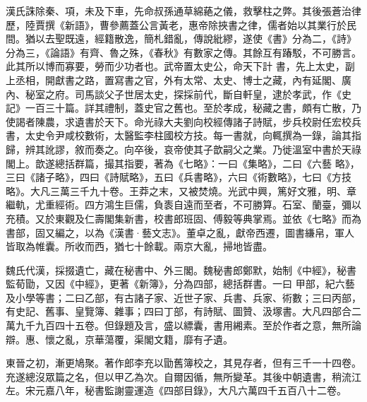 \begin{pinyinscope}
 漢氏誅除秦、項，未及下車，先命叔孫通草綿蕝之儀，救擊柱之弊。其後張蒼治律歷，陸賈撰《新語》，曹參薦蓋公言黃老，惠帝除挾書之律，儒者始以其業行於民間。猶以去聖既遠，經籍散逸，簡札錯亂，傳說紕繆，遂使《書》分為二，《詩》分為三，《論語》有齊、魯之殊，《春秋》有數家之傳。其餘互有踳駁，不可勝言。此其所以博而寡要，勞而少功者也。武帝置太史公，命天下計
 書，先上太史，副上丞相，開獻書之路，置寫書之官，外有太常、太史、博士之藏，內有延閣、廣內、秘室之府。司馬談父子世居太史，探採前代，斷自軒皇，逮於孝武，作《史記》一百三十篇。詳其禮制，蓋史官之舊也。至於孝成，秘藏之書，頗有亡散，乃使謁者陳農，求遺書於天下。命光祿大夫劉向校經傳諸子詩賦，步兵校尉任宏校兵書，太史令尹咸校數術，太醫監李柱國校方技。每一書就，向輒撰為一錄，論其指歸，辨其訛謬，敘而奏之。向卒後，哀帝使其子歆嗣父之業。乃徙溫室中書於天祿閣上。歆遂總括群篇，撮其指要，著為《七略》：一曰《集略》，二曰《六藝
 略》，三曰《諸子略》，四曰《詩賦略》，五曰《兵書略》，六曰《術數略》，七曰《方技略》。大凡三萬三千九十卷。王莽之末，又被焚燒。光武中興，篤好文雅，明、章繼軌，尤重經術。四方鴻生巨儒，負袠自遠而至者，不可勝算。石室、蘭臺，彌以充積。又於東觀及仁壽閣集新書，校書郎班固、傅毅等典掌焉。並依《七略》而為書部，固又編之，以為《漢書·藝文志》。董卓之亂，獻帝西遷，圖書縑帛，軍人皆取為帷囊。所收而西，猶七十餘載。兩京大亂，掃地皆盡。



 魏氏代漢，採掇遺亡，藏在秘書中、外三閣。魏秘書郎鄭默，始制《中經》，秘書監荀勖，又因《中經》，更著《新簿》，分為四部，總括群書。一曰
 甲部，紀六藝及小學等書；二曰乙部，有古諸子家、近世子家、兵書、兵家、術數；三曰丙部，有史記、舊事、皇覽簿、雜事；四曰丁部，有詩賦、圖贊、汲塚書。大凡四部合二萬九千九百四十五卷。但錄題及言，盛以縹囊，書用緗素。至於作者之意，無所論辯。惠、懷之亂，京華蕩覆，渠閣文籍，靡有孑遺。



 東晉之初，漸更鳩聚。著作郎李充以勖舊簿校之，其見存者，但有三千一十四卷。充遂總沒眾篇之名，但以甲乙為次。自爾因循，無所變革。其後中朝遺書，稍流江左。宋元嘉八年，秘書監謝靈運造《四部目錄》，大凡六萬四千五百八十二卷。




\end{pinyinscope}
